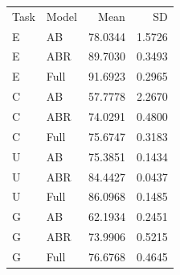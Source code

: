 \begin{tabular}{llrr}
Task & Model & Mean & SD \\
E & AB & 78.0344 & 1.5726 \\
E & ABR & 89.7030 & 0.3493 \\
E & Full & 91.6923 & 0.2965 \\
C & AB & 57.7778 & 2.2670 \\
C & ABR & 74.0291 & 0.4800 \\
C & Full & 75.6747 & 0.3183 \\
U & AB & 75.3851 & 0.1434 \\
U & ABR & 84.4427 & 0.0437 \\
U & Full & 86.0968 & 0.1485 \\
G & AB & 62.1934 & 0.2451 \\
G & ABR & 73.9906 & 0.5215 \\
G & Full & 76.6768 & 0.4645 \\
\end{tabular}
